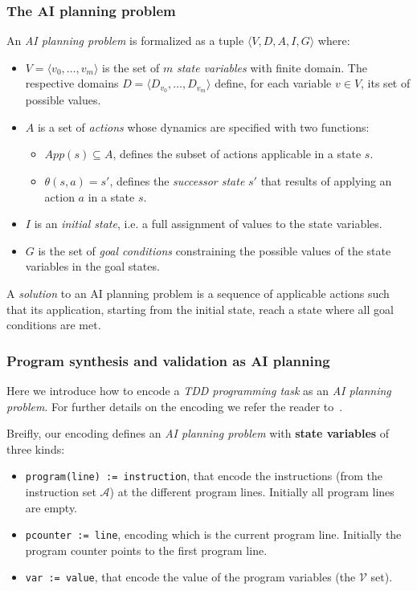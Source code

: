 \documentclass[10pt,a4paper]{paper}
\newcommand{\tup}[1]{{\langle #1 \rangle}}
\begin{document}
\subsubsection{The AI planning problem}
An {\em AI planning problem} is formalized as a tuple $\tup{V,D,A,I,G}$ where:
\begin{itemize}
\item $V=\tup{v_0, \ldots, v_m}$ is the set of $m$ {\em state variables} with finite domain. The respective domains $D=\tup{D_{v_0}, \ldots, D_{v_m}}$ define, for each variable $v\in V$, its set of possible values.
\item $A$ is a set of {\em actions} whose dynamics are specified with two functions:
\begin{itemize}
\item $App(s)\subseteq A$, defines the subset of actions applicable in a state $s$.
\item $\theta(s,a)=s'$, defines the {\em successor state} $s'$ that results of applying an action $a$ in a state $s$.
\end{itemize}  
\item $I$ is an {\em initial state}, i.e. a full assignment of values to the state variables.
\item $G$ is the set of {\em goal conditions} constraining the possible values of the state variables in the goal states.  
\end{itemize}
A {\em solution} to an AI planning problem is a sequence of applicable actions such that its application, starting from the initial state, reach a state where all goal conditions are met.

\subsubsection{Program synthesis and validation as AI planning}
Here we introduce how to encode a {\em TDD programming task} as an {\em AI planning problem}. For further details on the encoding we refer the reader to~\cite{jimenez2015computing,sergio:aprograming:icaps16,sergio:aprogramingb:ijcai16,sergio:aprograming:ijcai16,segovia2017generating,segovia:FSC:JAIR2018,segovia:programs:AIJ19}.

Breifly, our encoding defines an {\em AI planning problem} with {\bf state variables} of three kinds:
\begin{itemize}
\item {\tt program(line) := instruction}, that encode the instructions (from the instruction set ${\mathcal A}$) at the different program lines. Initially all program lines are empty.
\item {\tt pcounter := line}, encoding which is the current program line. Initially the program counter points to the first program line.
\item {\tt var := value}, that encode the value of the program variables (the ${\mathcal V}$ set).
\end {itemize}
\end{document}
